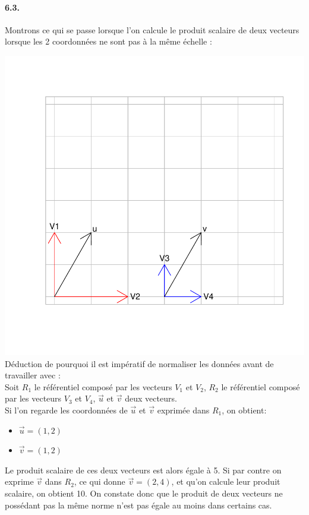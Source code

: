 \documentclass{article}
\begin{document}
\paragraph{6.3.}Montrons ce qui se passe lorsque l'on calcule le produit
 scalaire de deux vecteurs lorsque les 2 coordonnées ne sont pas à la 
 même échelle :

\includegraphics{rapport-graphic}
\newline
Déduction de pourquoi il est impératif de normaliser les données avant 
de travailler avec :\\
Soit $R_{1}$ le référentiel composé par les vecteurs $V_{1}$ et $V_{2}$,
 $R_{2}$ le référentiel composé par les vecteurs $V_{3}$ et $V_{4}$, 
 $\vec{u}$ et $\vec{v}$ deux vecteurs. \\
Si l'on regarde les coordonnées de $\vec{u}$ et $\vec{v}$ exprimée dans 
$R_{1}$, on obtient:
\begin{itemize}
	\item{$\vec{u}=(1,2)$}
	\item{$\vec{v}=(1,2)$}
\end{itemize}
Le produit scalaire de ces deux vecteurs est alors égale à 5.
Si par contre on exprime $\vec{v}$ dans $R_{2}$, ce qui donne $\vec{v}=(2,4)$, et qu'on calcule leur produit scalaire, on obtient 10.
On constate donc que le produit de deux vecteurs ne possédant pas la même norme n'est pas égale au moins dans certains cas.
\end{document}
